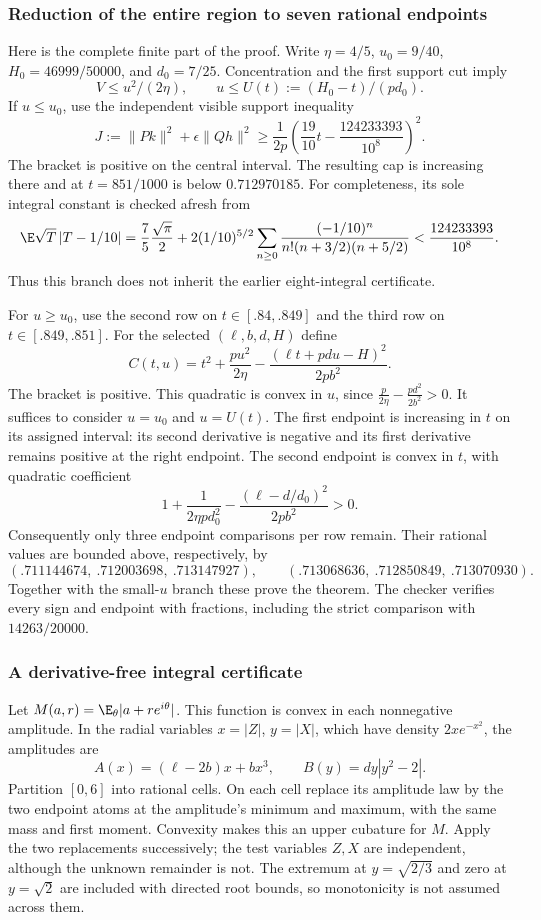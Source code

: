 \subsubsection{Reduction of the entire region to seven rational endpoints}
Here is the complete finite part of the proof. Write $\eta=4/5$,
$u_0=9/40$, $H_0=46999/50000$, and $d_0=7/25$. Concentration and the
first support cut imply
\[
 V\le u^2/(2\eta),\qquad u\le U(t):=(H_0-t)/(pd_0).
\]
If $u\le u_0$, use the independent visible support inequality
\[
 J:=\|Pk\|^2+\epsilon\|Qh\|^2
 \ge\frac1{2p}\left(\frac{19}{10}t-\frac{124233393}{10^8}\right)^2.
\]
The bracket is positive on the central interval. The resulting cap is
increasing there and at $t=851/1000$ is below $0.712970185$.
For completeness, its sole integral constant is checked afresh from
\[
 \E\sqrt T\,|T-1/10|
 =\frac75\frac{\sqrt\pi}{2}
 +2(1/10)^{5/2}\sum_{n\ge0}
 \frac{(-1/10)^n}{n!(n+3/2)(n+5/2)}
 <\frac{124233393}{10^8}.
\]
Thus this branch does not inherit the earlier eight-integral certificate.

For $u\ge u_0$, use the second row on $t\in[.84,.849]$ and the third
row on $t\in[.849,.851]$. For the selected $(\ell,b,d,H)$ define
\[
 C(t,u)=t^2+\frac{pu^2}{2\eta}
           -\frac{(\ell t+pdu-H)^2}{2pb^2}.
\]
The bracket is positive. This quadratic is convex in $u$, since
$\frac p{2\eta}-\frac{pd^2}{2b^2}>0$. It suffices to consider
$u=u_0$ and $u=U(t)$. The first endpoint is increasing in $t$ on its
assigned interval: its second derivative is negative and its first
derivative remains positive at the right endpoint. The second endpoint
is convex in $t$, with quadratic coefficient
\[
 1+\frac1{2\eta p d_0^2}
       -\frac{(\ell-d/d_0)^2}{2pb^2}>0.
\]
Consequently only three endpoint comparisons per row remain. Their
rational values are bounded above, respectively, by
\[
 (.711144674,\ .712003698,\ .713147927),\qquad
 (.713068636,\ .712850849,\ .713070930).
\]
Together with the small-$u$ branch these prove the theorem. The checker
verifies every sign and endpoint with fractions, including the strict
comparison with $14263/20000$.

\subsubsection{A derivative-free integral certificate}
Let $M(a,r)=\E_\theta|a+re^{i\theta}|$. This function is convex in each
nonnegative amplitude. In the radial variables $x=|Z|$, $y=|X|$,
which have density $2xe^{-x^2}$, the amplitudes are
\[
 A(x)=(\ell-2b)x+bx^3,\qquad B(y)=dy|y^2-2|.
\]
Partition $[0,6]$ into rational cells. On each cell replace its amplitude
law by the two endpoint atoms at the amplitude's minimum and maximum,
with the same mass and first moment. Convexity makes this an upper
cubature for $M$. Apply the two replacements successively; the test
variables $Z,X$ are independent, although the unknown remainder is not.
The extremum at $y=\sqrt{2/3}$ and zero at $y=\sqrt2$ are included
with directed root bounds, so monotonicity is not assumed across them.

